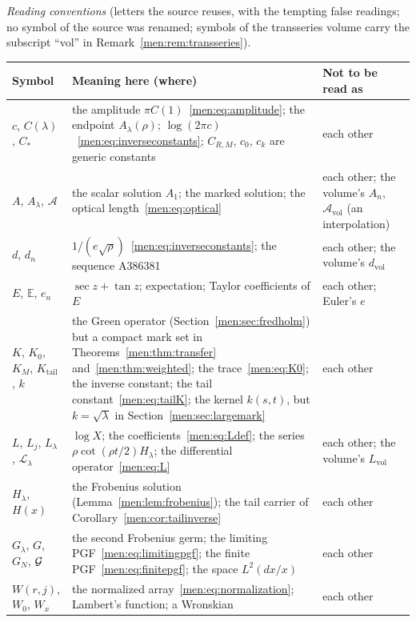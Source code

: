 \documentclass[11pt,letterpaper]{article}
\theoremstyle{remark}\newtheorem{remark}[theorem]{Remark}
\newcommand{\E}{\mathbb E}\newcommand{\PP}{\mathbb P}
\begin{document}
\medskip
\begingroup\small
\noindent\emph{Reading conventions} (letters the source reuses, with the
tempting false readings; no symbol of the source was renamed; symbols of the
transseries volume carry the subscript ``vol'' in
Remark~\ref{men:rem:transseries}).\par\smallskip
\renewcommand{\arraystretch}{1.1}
\begin{longtable}{@{}>{\raggedright\arraybackslash}p{0.95in}>{\raggedright\arraybackslash}p{3.3in}>{\raggedright\arraybackslash}p{1.85in}@{}}
\toprule
Symbol & Meaning here (where) & Not to be read as\\
\midrule
\endhead
$c$, $C(\lambda)$, $C_*$ & the amplitude $\pi C(1)$~\eqref{men:eq:amplitude}; the endpoint $A_\lambda(\rho)$; $\log(2\pi c)$~\eqref{men:eq:inverseconstants}; $C_{R,M}$, $c_0$, $c_k$ are generic constants & each other\\
$A$, $A_\lambda$, $\mathcal A$ & the scalar solution $A_1$; the marked solution; the optical length~\eqref{men:eq:optical} & each other; the volume's $A_n$, $\mathcal A_{\mathrm{vol}}$ (an interpolation)\\
$d$, $d_n$ & $1/(e\sqrt\rho)$~\eqref{men:eq:inverseconstants}; the sequence A386381 & each other; the volume's $d_{\mathrm{vol}}$\\
$E$, $\E$, $e_n$ & $\sec z+\tan z$; expectation; Taylor coefficients of $E$ & each other; Euler's $e$\\
$K$, $K_0$, $K_M$, $K_{\mathrm{tail}}$, $k$ & the Green operator (Section~\ref{men:sec:fredholm}) but a compact mark set in Theorems~\ref{men:thm:transfer} and~\ref{men:thm:weighted}; the trace~\eqref{men:eq:K0}; the inverse constant; the tail constant~\eqref{men:eq:tailK}; the kernel $k(s,t)$, but $k=\sqrt\lambda$ in Section~\ref{men:sec:largemark} & each other\\
$L$, $L_j$, $L_\lambda$, $\mathcal L_\lambda$ & $\log X$; the coefficients~\eqref{men:eq:Ldef}; the series $\rho\cot(\rho t/2)H_\lambda$; the differential operator~\eqref{men:eq:L} & each other; the volume's $L_{\mathrm{vol}}$\\
$H_\lambda$, $H(x)$ & the Frobenius solution (Lemma~\ref{men:lem:frobenius}); the tail carrier of Corollary~\ref{men:cor:tailinverse} & each other\\
$G_\lambda$, $G$, $G_N$, $\mathcal G$ & the second Frobenius germ; the limiting PGF~\eqref{men:eq:limitingpgf}; the finite PGF~\eqref{men:eq:finitepgf}; the space $L^2(dx/x)$ & each other\\
$W(r,j)$, $W_0$, $W_x$ & the normalized array~\eqref{men:eq:normalization}; Lambert's function; a Wronskian & each other\\

\end{longtable}
\end{document}
